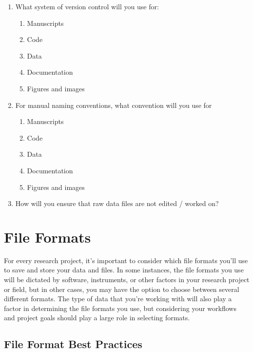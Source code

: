 \documentclass[
]{book}
\providecommand{\tightlist}{%
  \setlength{\itemsep}{0pt}\setlength{\parskip}{0pt}}
\begin{document}
\begin{enumerate}
\def\labelenumi{\arabic{enumi}.}
\tightlist
\item
  What system of version control will you use for:

  \begin{enumerate}
  \def\labelenumii{\alph{enumii}.}
  \tightlist
  \item
    Manuscripts
  \item
    Code
  \item
    Data
  \item
    Documentation
  \item
    Figures and images
  \end{enumerate}
\item
  For manual naming conventions, what convention will you use for

  \begin{enumerate}
  \def\labelenumii{\alph{enumii}.}
  \tightlist
  \item
    Manuscripts
  \item
    Code
  \item
    Data
  \item
    Documentation
  \item
    Figures and images
  \end{enumerate}
\item
  How will you ensure that raw data files are not edited / worked on?
\end{enumerate}

\hypertarget{file-formats-1}{%
\chapter*{File Formats}\label{file-formats-1}}

For every research project, it's important to consider which file formats you'll use to save and store your data and files. In some instances, the file formats you use will be dictated by software, instruments, or other factors in your research project or field, but in other cases, you may have the option to choose between several different formats. The type of data that you're working with will also play a factor in determining the file formats you use, but considering your workflows and project goals should play a large role in selecting formats.

\hypertarget{file-format-best-practices}{%
\section*{File Format Best Practices}\label{file-format-best-practices}}
\end{document}
